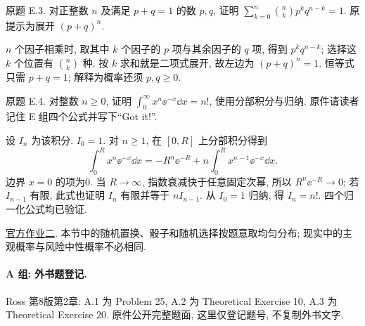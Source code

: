 \begin{exercise}\label{ps1-e3}
原题 E.3. 对正整数 $n$ 及满足 $p+q=1$ 的数 $p,q$, 证明 $\sum_{k=0}^n\binom nkp^kq^{n-k}=1$. 原提示为展开 $(p+q)^n$.
\end{exercise}
\begin{solution}
$n$ 个因子相乘时, 取其中 $k$ 个因子的 $p$ 项与其余因子的 $q$ 项, 得到 $p^kq^{n-k}$; 选择这 $k$ 个位置有 $\binom nk$ 种. 按 $k$ 求和就是二项式展开, 故左边为 $(p+q)^n=1$. 恒等式只需 $p+q=1$; 解释为概率还须 $p,q\ge0$.
\end{solution}

\begin{exercise}\label{ps1-e4}
原题 E.4. 对整数 $n\ge0$, 证明 $\int_0^\infty x^n\ee^{-x}\dd x=n!$, 使用分部积分与归纳. 原件请读者记住 E 组四个公式并写下“Got it!”.
\end{exercise}
\begin{solution}
设 $I_n$ 为该积分. $I_0=1$. 对 $n\ge1$, 在 $[0,R]$ 上分部积分得到
\[
\int_0^R x^n\ee^{-x}\dd x=-R^n\ee^{-R}+n\int_0^R x^{n-1}\ee^{-x}\dd x.
\]
边界 $x=0$ 的项为0. 当 $R\to\infty$, 指数衰减快于任意固定次幂, 所以 $R^n\ee^{-R}\to0$; 若 $I_{n-1}$ 有限, 此式也证明 $I_n$ 有限并等于 $nI_{n-1}$. 从 $I_0=1$ 归纳, 得 $I_n=n!$. 四个归一化公式均已验证.
\end{solution}

\href{https://ocw.mit.edu/courses/18-600-probability-and-random-variables-fall-2019/resources/mit18_600f19_pset2/}{官方作业二}. 本节中的随机置换、骰子和随机选择按题意取均匀分布; 现实中的主观概率与风险中性概率不必相同.

\paragraph{A 组: 外书题登记.}
Ross 第8版第2章: A.1 为 Problem 25, A.2 为 Theoretical Exercise 10, A.3 为 Theoretical Exercise 20. 原件公开完整题面, 这里仅登记题号, 不复制外书文字.

